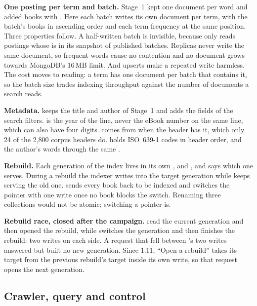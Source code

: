 \textbf{One posting per term and batch.} Stage~1 kept one document per word and added books with .
Here each batch writes its own document per term, with the batch's books in ascending order and each term frequency at
the same position. Three properties follow. A half-written batch is invisible, because  only reads
postings whose  is in its snapshot of published batches. Replicas never write the same document, so
frequent words cause no contention and no document grows towards MongoDB's 16\,MB limit. And upserts make a repeated
write harmless. The cost moves to reading: a term has one document per batch that contains it, so the batch size trades
indexing throughput against the number of documents a search reads.

\textbf{Metadata.}  keeps the title and author of Stage~1 and adds the fields of the search
filters.  is the year of the  line, never the eBook number on the same line, which can
also have four digits.  comes from  when the header has it, which only
24 of the 2{,}800 corpus headers do.  holds ISO~639-1 codes in header order, and  the
author's words through the same .

\textbf{Rebuild.} Each generation of the index lives in its own ,  and
, and  says which one  serves. During a rebuild the indexer
writes into the target generation while  keeps serving the old one.  sends every book back to
be indexed and switches the pointer with one write once no book blocks the switch. Renaming three collections would
not be atomic; switching a pointer is.

\textbf{Rebuild race, closed after the campaign.}  read the current generation and then
opened the rebuild, while  switches the generation and then finishes the rebuild: two writes on each
side. A request that fell between 's two writes answered  but built no new generation. Since
 1.11, ``Open a rebuild'' takes its target from the previous rebuild's target inside its own write, so
that request opens the next generation.

\subsection{Crawler, query and control}

